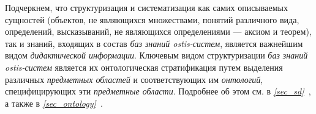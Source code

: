 \vspace{-\baselineskip}

\begin{SCn}
\end{SCn}

\vspace{-\baselineskip}

\begin{SCn}
\end{SCn}

\vspace{-\baselineskip}

\begin{SCn}
\end{SCn}

\vspace{-\baselineskip}

\begin{SCn}
\end{SCn}

\vspace{-\baselineskip}

\begin{SCn}
\end{SCn}

\vspace{-\baselineskip}

\begin{SCn}
\end{SCn}

Подчеркнем, что структуризация и систематизация как самих описываемых сущностей (объектов, не являющихся множествами, понятий различного вида, определений, высказываний, не являющихся определениями --- аксиом и теорем), так и знаний, входящих в состав \textit{баз знаний ostis-систем}, является важнейшим видом \textit{дидактической информации}. Ключевым видом структуризации \textit{баз знаний ostis-систем} является их онтологическая стратификация путем выделения различных \textit{предметных областей} и соответствующих им \textit{онтологий}, специфицирующих эти \textit{предметные области}. Подробнее об этом см. в \textit{\ref{sec_sd}~}, а также в \textit{\ref{sec_ontology}~}.

